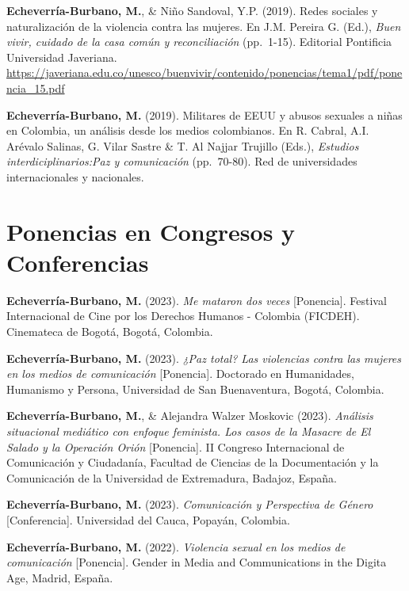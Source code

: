 \documentclass[11pt,a4paper,]{awesome-cv}
\begin{document}
\textbf{Echeverría-Burbano, M.}, \& Niño Sandoval, Y.P. (2019). Redes
sociales y naturalización de la violencia contra las mujeres. En J.M.
Pereira G. (Ed.), \emph{Buen vivir, cuidado de la casa común y
reconciliación} (pp.~1-15). Editorial Pontificia Universidad Javeriana.
\url{https://javeriana.edu.co/unesco/buenvivir/contenido/ponencias/tema1/pdf/ponencia_15.pdf}

\textbf{Echeverría-Burbano, M.} (2019). Militares de EEUU y abusos
sexuales a niñas en Colombia, un análisis desde los medios colombianos.
En R. Cabral, A.I. Arévalo Salinas, G. Vilar Sastre \& T. Al Najjar
Trujillo (Eds.), \emph{Estudios interdiciplinarios:Paz y comunicación}
(pp.~70-80). Red de universidades internacionales y nacionales.

\endgroup

\hypertarget{ponencias-en-congresos-y-conferencias}{%
\section{Ponencias en Congresos y
Conferencias}\label{ponencias-en-congresos-y-conferencias}}

\begingroup
\setlength{\parindent}{-0.5in}
\setlength{\leftskip}{0.5in}

\textbf{Echeverría-Burbano, M.} (2023). \emph{Me mataron dos veces}
{[}Ponencia{]}. Festival Internacional de Cine por los Derechos Humanos
- Colombia (FICDEH). Cinemateca de Bogotá, Bogotá, Colombia.

\textbf{Echeverría-Burbano, M.} (2023). \emph{¿Paz total? Las violencias
contra las mujeres en los medios de comunicación} {[}Ponencia{]}.
Doctorado en Humanidades, Humanismo y Persona, Universidad de San
Buenaventura, Bogotá, Colombia.

\textbf{Echeverría-Burbano, M.}, \& Alejandra Walzer Moskovic (2023).
\emph{Análisis situacional mediático con enfoque feminista. Los casos de
la Masacre de El Salado y la Operación Orión} {[}Ponencia{]}. II
Congreso Internacional de Comunicación y Ciudadanía, Facultad de
Ciencias de la Documentación y la Comunicación de la Universidad de
Extremadura, Badajoz, España.

\textbf{Echeverría-Burbano, M.} (2023). \emph{Comunicación y Perspectiva
de Género} {[}Conferencia{]}. Universidad del Cauca, Popayán, Colombia.

\textbf{Echeverría-Burbano, M.} (2022). \emph{Violencia sexual en los
medios de comunicación} {[}Ponencia{]}. Gender in Media and
Communications in the Digita Age, Madrid, España.
\end{document}
